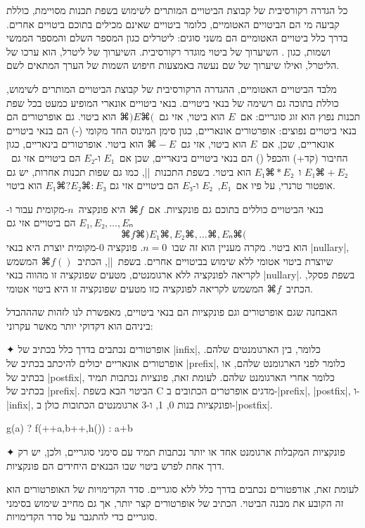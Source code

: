 כל הגדרה רקורסיבית של קבוצת הביטויים המותרים לשימוש בשפת תכנות מסויימת, כוללת
קביעה מי הם הביטויים האטומיים, כלומר ביטויים שאינם מכילים בתוכם ביטויים אחרים.
בדרך כלל ביטויים האטומיים הם משני סוגים: ליטרלים כגון המספר השלם  והמספר
הממשי  ושמות, כגון . השיערוך של ביטוי מוגדר רקורסיבית. השיערוך
של ליטרל, הוא ערכו של הליטרל, ואילו שיערוך של שם נעשה באמצעות חיפוש השמות של
הערך המתאים לשם.

מלבד הביטויים האטומיים, ההגדרה הרקורסיבית של קבוצת הביטויים המותרים לשימוש,
כוללת בתוכה גם רשימה של בנאי ביטויים. בנאי ביטויים אונארי המופיע כמעט בכל שפת
תכנות נפוץ הוא זוג סוגריים: אם~$E$ הוא ביטוי, אזי גם~$⌘)E⌘($ הוא ביטוי.
גם אופרטורים הם בנאי ביטויים נפוצים: אופרטורים אונאריים, כגון סימן המינוס החד
מקומי (-) הם בנאי ביטויים אונאריים, שכן, אם~$E$ הוא ביטוי,
אזי גם~$⌘-E$ הוא ביטוי. אופרטורים בינאריים, כגון החיבור (קד+) והכפל () הם
בנאי ביטויים בינאריים, שכן אם~$E₁$ ו-$E₂$ הם ביטויים אזי גם~$E₁⌘+E₂$
ו~$E₁⌘*E₂$ הוא ביטוי. בשפת התכנות~\E|\CPL|, כמו גם שפות תכנות אחרות, יש גם
אופטור טרנרי, על פיו אם~$E₁$,~$E₂$ ו-$E₃$ הם ביטויים אזי גם
$E₁⌘?E₂⌘:E₃$ הוא ביטוי.

בנאי הביטויים כוללים בתוכם גם פונקציות. אם~$⌘f$ היא פונקציה~$n$-מקומית עבור
ו-$E₁,E₂,…,Eₙ$ הם ביטויים אזי גם \[
  ⌘f⌘)E₁⌘,E₂⌘,…⌘,Eₙ⌘(
\] הוא ביטוי. מקרה מעניין הוא זה שבו~$n=0$. פונקציה 0-מקומית יוצרת היא בנאי
\E|nullary|, שיוצרת ביטוי אטומי ללא שימוש בביטויים אחרים. בשפת~\E|\CPL|,
הכתיב~$⌘{f()}$ המשמש לקריאה לפונקציה ללא ארגומנטים, מטעים שפונקציה זו מהווה
בנאי \E|nullary|. בשפת פסקל, הכתיב~$⌘f$ המשמש לקריאה לפונקציה כזו מטעים
שפונקציה זו היא ביטוי אטומי.

האבחנה שגם אופרטורים וגם פונקציות הם בנאי ביטויים, מאפשרת לנו לזהות שהההבדל
ביניהם הוא דקדוקי יותר מאשר עקרוני:

✦ אופרטורים נכתבים בדרך כלל בכתיב של \E|infix|, כלומר, בין הארגומנטים שלהם.
אופרטורים אונאריים יכולים להיכתב בכתיב של \E|prefix|, כלומר לפני הארגומנט שלהם,
או בכתיב של \E|postfix|, כלומר אחרי הארגומנט שלהם. לעומת זאת, פונציות נכתבות
תמיד בכתיב של \E|prefix|.
הביטוי הבא בשפת C מדגים אופרטרים הכתובים ב-\E|prefix|, \E|postfix|, ו-\E|infix|,
ופונקציות בנות 0, 1, ו-3 ארגומנטים הכתובות כולן ב-\E|postfix|.
\begin{CPP}
  g(a) ? f(++a,b++,h()) : a+b
\end{CPP}
✦ פונקציות המקבלות ארגומנט אחד או יותר נכתבות תמיד עם סימני סוגריים, ולכן, יש
רק דרך אחת לפרש ביטוי שבו הבנאים היחידים הם פונקציות.

לעומת זאת, אורפטורים נכתבים בדרך כלל ללא סוגריים. סדר הקדימויות של האופרטורים
הוא זה הקובע את מבנה הביטוי. הכתיב של אופרטורים קצר יותר, אך גם מחייב
שימוש בסימני סוגריים כדי להתגבר על סדר הקדימויות.

